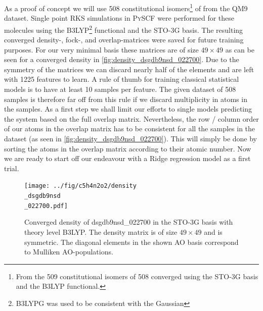 As a proof of concept we will use 508 constitutional isomers\footnote{From the 509 constitutional isomers of  508 converged using the STO-3G basis and the B3LYP functional.} of  from the QM9 dataset. 
Single point RKS simulations in \textsc{PySCF} \parencite{ref:pyscf} were performed for these molecules using the B3LYP\footnote{B3LYPG was used to be consistent with the Gaussian} functional and the STO-3G basis. The resulting converged density-, fock-, and overlap-matrices were saved for future training purposes. For our very minimal basis these matrices are of size $49 \times 49$ as can be seen for a converged density in \autoref{fig:density_dsgdb9nsd_022700}. 
Due to the symmetry of the matrices we can discard nearly half of the elements and are left with 1225 features to learn. A rule of thumb for training classical statistical models is to have at least 10 samples per feature. \parencite{ref:rule_of_10} The given dataset of 508 samples is therefore far off from this rule if we discard multiplicity in atoms in the samples. As a first step we shall limit our efforts to single models predicting the system based on the full overlap matrix. Nevertheless, the row / column order of our atoms in the overlap matrix has to be consistent for all the samples in the dataset (as seen in \autoref{fig:density_dsgdb9nsd_022700}). This will simply be done by sorting the atoms in the overlap matrix according to their atomic number. Now we are ready to start off our endeavour with a Ridge regression model as a first trial. 

\begin{figure}[H]
    \centering
    \texttt{[image: ../fig/c5h4n2o2/density\\\_dsgdb9nsd\\\_022700.pdf]}
    \caption[Density matrix of dsgdb9nsd\_022700 in the STO-3G basis with theory level B3LYP]{Converged density of dsgdb9nsd\_022700 in the STO-3G basis with theory level B3LYP. The density matrix is of size $49 \times 49$ and is symmetric. The diagonal elements in the shown AO basis correspond to Mulliken AO-populations. }
    \label{fig:density_dsgdb9nsd_022700}
\end{figure}


